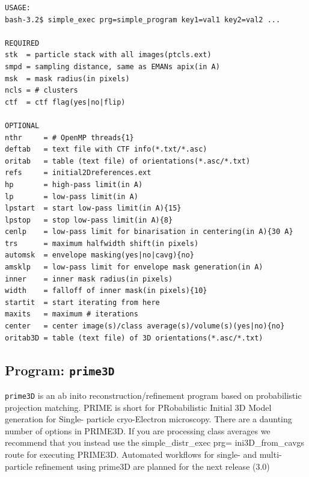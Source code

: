 \documentclass[a4paper,11pt]{article}
\newcommand{\prgname}[1]{\textcolor{NavyBlue}{\texttt{#1}}}
\begin{document}
\begin{verbatim}
USAGE:
bash-3.2$ simple_exec prg=simple_program key1=val1 key2=val2 ...

REQUIRED
stk  = particle stack with all images(ptcls.ext)
smpd = sampling distance, same as EMANs apix(in A)
msk  = mask radius(in pixels)
ncls = # clusters
ctf  = ctf flag(yes|no|flip)

OPTIONAL
nthr     = # OpenMP threads{1}
deftab   = text file with CTF info(*.txt/*.asc)
oritab   = table (text file) of orientations(*.asc/*.txt)
refs     = initial2Dreferences.ext
hp       = high-pass limit(in A)
lp       = low-pass limit(in A)
lpstart  = start low-pass limit(in A){15}
lpstop   = stop low-pass limit(in A){8}
cenlp    = low-pass limit for binarisation in centering(in A){30 A}
trs      = maximum halfwidth shift(in pixels)
automsk  = envelope masking(yes|no|cavg){no}
amsklp   = low-pass limit for envelope mask generation(in A)
inner    = inner mask radius(in pixels)
width    = falloff of inner mask(in pixels){10}
startit  = start iterating from here
maxits   = maximum # iterations
center   = center image(s)/class average(s)/volume(s)(yes|no){no}
oritab3D = table (text file) of 3D orientations(*.asc/*.txt)
\end{verbatim}

\subsection{Program: \prgname{prime3D}}
\label{prime3D}
\prgname{prime3D} is an ab inito reconstruction/refinement program based on probabilistic projection matching. PRIME is short for PRobabilistic Initial 3D Model generation for Single- particle cryo-Electron microscopy. There are a daunting number of options in PRIME3D. If you are processing class averages we recommend that you instead use the simple\_distr\_exec prg= ini3D\_from\_cavgs route for executing PRIME3D. Automated workflows for single- and multi-particle refinement using prime3D are planned for the next release (3.0)
\end{document}
